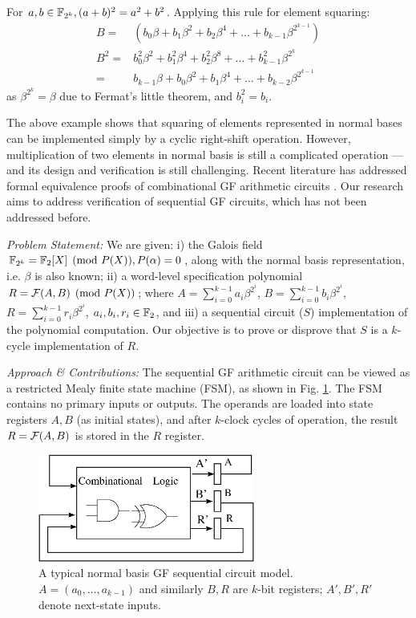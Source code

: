 \begin{Example}
\label{ex:nb_sq}
For $a, b \in {\mathbb{F}}_{2^k}, (a+b)^2 = a^2 + b^2$. Applying this rule for
element squaring: 
\begin{align}
B = & (b_0\beta + b_1\beta^2 + b_2\beta^4 + \dots + b_{k-1}\beta^{2^{k-1}}) \nonumber\\
B^2 = &b_0^2\beta^2 + b_1^2\beta^4 + b_2^2\beta^8 + \dots + b_{k-1}^2\beta^{2^k} \nonumber\\
= &b_{k-1}\beta + b_0\beta^2 + b_1\beta^4 + \dots + b_{k-2}\beta^{2^{k-1}} \nonumber
\end{align}
as $\beta^{2^k} = \beta$ due to Fermat's little theorem, and $b_i^2 = b_i$. 
\end{Example}

The above example shows that squaring of elements represented in
normal bases can be implemented simply by a cyclic right-shift
operation. However, multiplication of two elements in normal basis is
still a complicated operation --- and its design and verification is still
challenging. Recent literature has addressed formal equivalence proofs
of { combinational} GF arithmetic circuits \cite{ibm:blueveri}
\cite{lv:tcad2013} \cite{pruss:dac14}. Our research aims to address verification
of sequential GF circuits, which has not been addressed before. 


{\it Problem Statement:} We are given: 
i) the Galois field ${\mathbb{F}}_{2^k} = {\mathbb{F}}_{2}[X] \pmod{ P(X)}, P(\alpha) = 0$,
along with the { normal basis representation}, i.e. $\beta$ is also
known; 
ii) a word-level specification polynomial $R = {\mathcal{F}}(A, B) \pmod{ P(X)}$;
where $A = \sum _{i=0}^{k-1} a_i \beta^{2^{i}}$, $B = \sum
_{i=0}^{k-1} b_i \beta^{2^{i}}$, $R = \sum _{i=0}^{k-1} r_i
\beta^{2^{i}}$, $ a_i, b_i, r_i \in {\mathbb{F}}_{2}$, and iii) a sequential
circuit ($S$) implementation of the 
polynomial computation. Our objective is to prove or disprove that $S$
is a $k$-cycle implementation of $R$. 

{\it Approach \& Contributions:} The sequential GF arithmetic circuit
can be viewed as a {restricted} Mealy finite state machine (FSM),
as shown in Fig. \ref{fig:sequential}. The FSM contains no
primary inputs or outputs. The operands are loaded into state
registers $A, B$ (as initial states), and after $k$-clock cycles of
operation, the result $R = {\mathcal{F}}(A, B)$ is stored in the $R$ register. 

\begin{figure}[htb]
\begin{center}
\includegraphics[width=2.8in]{./gf_seq_model.eps}
\end{center}
\caption{\small A typical normal basis GF sequential circuit model. $A =
  (a_0,\dots,a_{k-1})$ and similarly $B, R$ are $k$-bit registers;
  $A', B', R'$ denote next-state inputs.}
\label{fig:sequential}
\end{figure}

